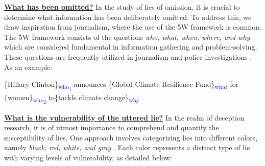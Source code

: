 

\vspace{-1mm}
\noindent
\textbf{\ul{What has been omitted?}} In the study of lies of omission, it is crucial to determine what information has been deliberately omitted. To address this, we draw inspiration from journalism, where the use of the 5W framework is common. The 5W framework consists of the questions \textit{who, what, when, where, and why} which are considered fundamental in information gathering and problem-solving. These questions are frequently utilized in journalism and police investigations \cite{10.2307/1023893, stofer2009sports, silverman, su2019study, smarts_2017,article_2023}. As an example:

\vspace{-1.5mm}  
\begin{tcolorbox}[left=0pt, right=0pt]
\small
\vspace{-1mm}
\{Hillary Clinton\}\textsubscript{\textcolor{blue}{who\textsubscript{1}}} announces \{Global Climate Resilience Fund\}\textsubscript{\textcolor{blue}{what}} for \{women\}\textsubscript{\textcolor{blue}{who\textsubscript{2}}}  
to\{tackle climate change\}\textsubscript{\textcolor{blue}{why}}
\vspace{-2.5mm}
\end{tcolorbox} 

\noindent
\textbf{\ul{What is the vulnerability of the uttered lie?}} In the realm of deception research, it is of utmost importance to comprehend and quantify the susceptibility of lies. One approach involves categorizing lies into different colors, namely \emph{black, red, white, and gray} \cite{ratliff2011behavioral,depaulo2004many}. Each color represents a distinct type of lie with varying levels of vulnerability, as detailed below:





